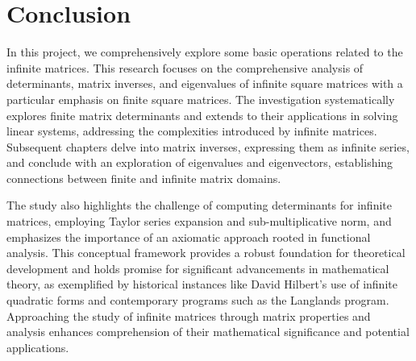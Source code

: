 \chapter*{Conclusion}
In this project, we comprehensively explore some basic operations related to the infinite matrices. This research focuses on the comprehensive analysis of determinants, matrix inverses, and eigenvalues of infinite square matrices with a particular emphasis on finite square matrices. The investigation systematically explores finite matrix determinants and extends to their applications in solving linear systems, addressing the complexities introduced by infinite matrices. Subsequent chapters delve into matrix inverses, expressing them as infinite series, and conclude with an exploration of eigenvalues and eigenvectors, establishing connections between finite and infinite matrix domains.

The study also highlights the challenge of computing determinants for infinite matrices, employing Taylor series expansion and sub-multiplicative norm, and emphasizes the importance of an axiomatic approach rooted in functional analysis. This conceptual framework provides a robust foundation for theoretical development and holds promise for significant advancements in mathematical theory, as exemplified by historical instances like David Hilbert's use of infinite quadratic forms and contemporary programs such as the Langlands program. Approaching the study of infinite matrices through matrix properties and analysis enhances comprehension of their mathematical significance and potential applications.
